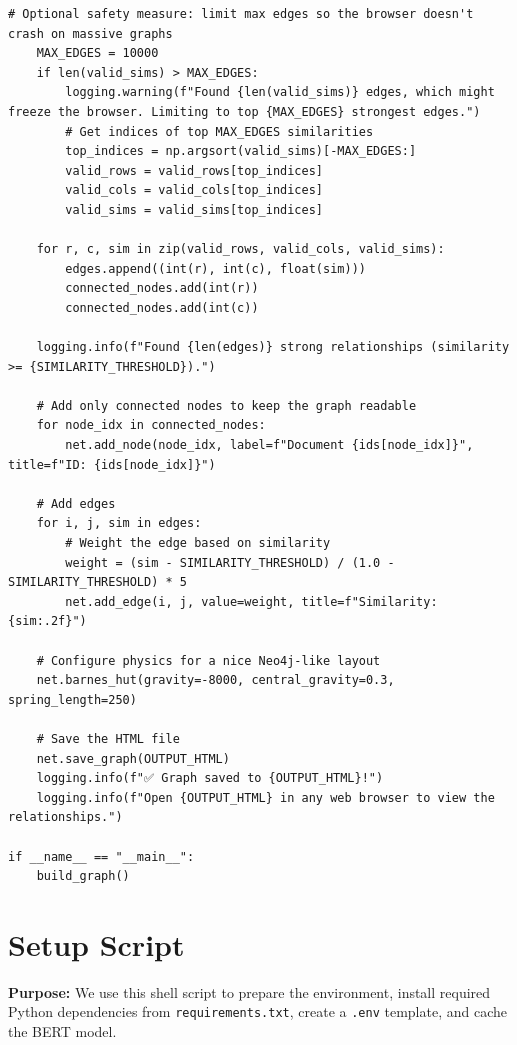 \documentclass[11pt]{article}
\begin{document}
\begin{lstlisting}[style=pythoncode, caption={visualize\_vector\_relationships.py}]
    # Optional safety measure: limit max edges so the browser doesn't crash on massive graphs
    MAX_EDGES = 10000
    if len(valid_sims) > MAX_EDGES:
        logging.warning(f"Found {len(valid_sims)} edges, which might freeze the browser. Limiting to top {MAX_EDGES} strongest edges.")
        # Get indices of top MAX_EDGES similarities
        top_indices = np.argsort(valid_sims)[-MAX_EDGES:]
        valid_rows = valid_rows[top_indices]
        valid_cols = valid_cols[top_indices]
        valid_sims = valid_sims[top_indices]

    for r, c, sim in zip(valid_rows, valid_cols, valid_sims):
        edges.append((int(r), int(c), float(sim)))
        connected_nodes.add(int(r))
        connected_nodes.add(int(c))
                
    logging.info(f"Found {len(edges)} strong relationships (similarity >= {SIMILARITY_THRESHOLD}).")
    
    # Add only connected nodes to keep the graph readable
    for node_idx in connected_nodes:
        net.add_node(node_idx, label=f"Document {ids[node_idx]}", title=f"ID: {ids[node_idx]}")
        
    # Add edges
    for i, j, sim in edges:
        # Weight the edge based on similarity
        weight = (sim - SIMILARITY_THRESHOLD) / (1.0 - SIMILARITY_THRESHOLD) * 5
        net.add_edge(i, j, value=weight, title=f"Similarity: {sim:.2f}")

    # Configure physics for a nice Neo4j-like layout
    net.barnes_hut(gravity=-8000, central_gravity=0.3, spring_length=250)
    
    # Save the HTML file
    net.save_graph(OUTPUT_HTML)
    logging.info(f"✅ Graph saved to {OUTPUT_HTML}!")
    logging.info(f"Open {OUTPUT_HTML} in any web browser to view the relationships.")

if __name__ == "__main__":
    build_graph()
\end{lstlisting}


\section{Setup Script} \label{sec:setup}
\textbf{Purpose:} We use this shell script to prepare the environment, install required Python dependencies from \texttt{requirements.txt}, create a \texttt{.env} template, and cache the BERT model.
\end{document}
